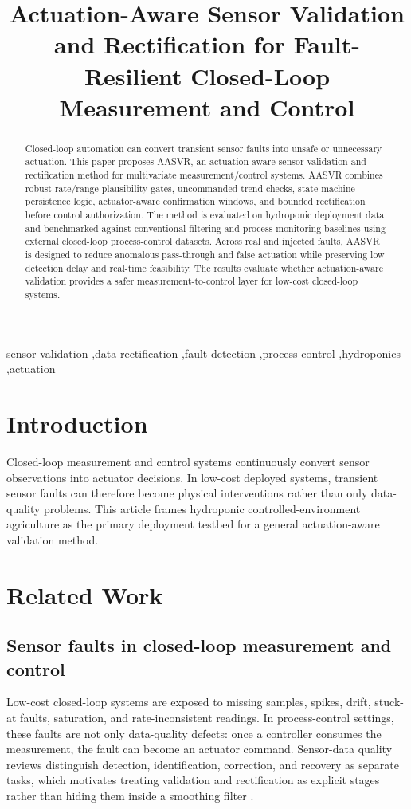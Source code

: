 \documentclass[preprint,12pt]{elsarticle}
\begin{document}
\begin{frontmatter}

\title{Actuation-Aware Sensor Validation and Rectification for Fault-Resilient Closed-Loop Measurement and Control}

\begin{abstract}
Closed-loop automation can convert transient sensor faults into unsafe or unnecessary actuation. This paper proposes AASVR, an actuation-aware sensor validation and rectification method for multivariate measurement/control systems. AASVR combines robust rate/range plausibility gates, uncommanded-trend checks, state-machine persistence logic, actuator-aware confirmation windows, and bounded rectification before control authorization. The method is evaluated on hydroponic deployment data and benchmarked against conventional filtering and process-monitoring baselines using external closed-loop process-control datasets. Across real and injected faults, AASVR is designed to reduce anomalous pass-through and false actuation while preserving low detection delay and real-time feasibility. The results evaluate whether actuation-aware validation provides a safer measurement-to-control layer for low-cost closed-loop systems.
\end{abstract}

\begin{keyword}
sensor validation \sep data rectification \sep fault detection \sep process control \sep hydroponics \sep actuation
\end{keyword}

\end{frontmatter}

\section{Introduction}
Closed-loop measurement and control systems continuously convert sensor observations into actuator decisions. In low-cost deployed systems, transient sensor faults can therefore become physical interventions rather than only data-quality problems. This article frames hydroponic controlled-environment agriculture as the primary deployment testbed for a general actuation-aware validation method.

\section{Related Work}
\subsection{Sensor faults in closed-loop measurement and control}
Low-cost closed-loop systems are exposed to missing samples, spikes, drift, stuck-at faults, saturation, and rate-inconsistent readings. In process-control settings, these faults are not only data-quality defects: once a controller consumes the measurement, the fault can become an actuator command. Sensor-data quality reviews distinguish detection, identification, correction, and recovery as separate tasks, which motivates treating validation and rectification as explicit stages rather than hiding them inside a smoothing filter \cite{teh2020sensorquality}.
\end{document}
